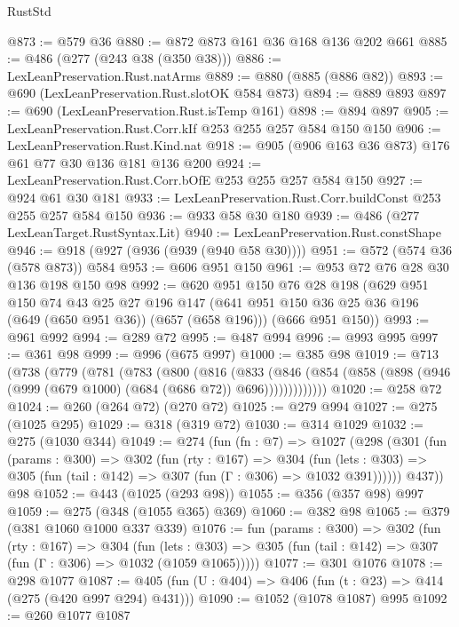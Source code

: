 \begin{lexlean}{RustStd}
\begin{coremodule}
@873 := @579 @36
@880 := @872 @873 @161 @36 @168 @136 @202 @661
@885 := @486 (@277 (@243 @38 (@350 @38)))
@886 := LexLeanPreservation.Rust.natArms
@889 := @880 (@885 (@886 @82))
@893 := @690 (LexLeanPreservation.Rust.slotOK @584 @873)
@894 := @889 @893
@897 := @690 (LexLeanPreservation.Rust.isTemp @161)
@898 := @894 @897
@905 := LexLeanPreservation.Rust.Corr.kIf @253 @255 @257 @584 @150 @150
@906 := LexLeanPreservation.Rust.Kind.nat
@918 := @905 (@906 @163 @36 @873) @176 @61 @77 @30 @136 @181 @136 @200
@924 := LexLeanPreservation.Rust.Corr.bOfE @253 @255 @257 @584 @150
@927 := @924 @61 @30 @181
@933 := LexLeanPreservation.Rust.Corr.buildConst @253 @255 @257 @584 @150
@936 := @933 @58 @30 @180
@939 := @486 (@277 LexLeanTarget.RustSyntax.Lit)
@940 := LexLeanPreservation.Rust.constShape
@946 := @918 (@927 (@936 (@939 (@940 @58 @30))))
@951 := @572 (@574 @36 (@578 @873)) @584
@953 := @606 @951 @150
@961 := @953 @72 @76 @28 @30 @136 @198 @150 @98
@992 := @620
    @951
    @150
    @76
    @28
    @198
    (@629
      @951
      @150
      @74
      @43
      @25
      @27
      @196
      @147
      (@641 @951 @150 @36 @25 @36 @196 (@649 (@650 @951 @36)) (@657 (@658 @196)))
      (@666 @951 @150))
@993 := @961 @992
@994 := @289 @72
@995 := @487 @994
@996 := @993 @995
@997 := @361 @98
@999 := @996 (@675 @997)
@1000 := @385 @98
@1019 := @713
    (@738
      (@779
        (@781
          (@783
            (@800
              (@816
                (@833
                  (@846
                    (@854 (@858 (@898 (@946 (@999 (@679 @1000) (@684 (@686 @72)) @696)))))))))))))
@1020 := @258 @72
@1024 := @260 (@264 @72) (@270 @72)
@1025 := @279 @994
@1027 := @275 (@1025 @295)
@1029 := @318 (@319 @72)
@1030 := @314 @1029
@1032 := @275 (@1030 @344)
@1049 := @274
    (fun (fn : @7) =>
    @1027
      (@298
        (@301
          (fun (params : @300) =>
          @302
            (fun (rty : @167) =>
            @304
              (fun (lets : @303) =>
              @305 (fun (tail : @142) => @307 (fun (Γ : @306) => @1032 @391))))))
        @437))
    @98
@1052 := @443 (@1025 (@293 @98))
@1055 := @356 (@357 @98) @997
@1059 := @275 (@348 (@1055 @365) @369)
@1060 := @382 @98
@1065 := @379 (@381 @1060 @1000 @337 @339)
@1076 := fun (params : @300) =>
  @302
    (fun (rty : @167) =>
    @304
      (fun (lets : @303) =>
      @305 (fun (tail : @142) => @307 (fun (Γ : @306) => @1032 (@1059 @1065)))))
@1077 := @301 @1076
@1078 := @298 @1077
@1087 := @405 (fun (U : @404) => @406 (fun (t : @23) => @414 (@275 (@420 @997 @294) @431)))
@1090 := @1052 (@1078 @1087) @995
@1092 := @260 @1077 @1087

\end{coremodule}
\end{lexlean}
